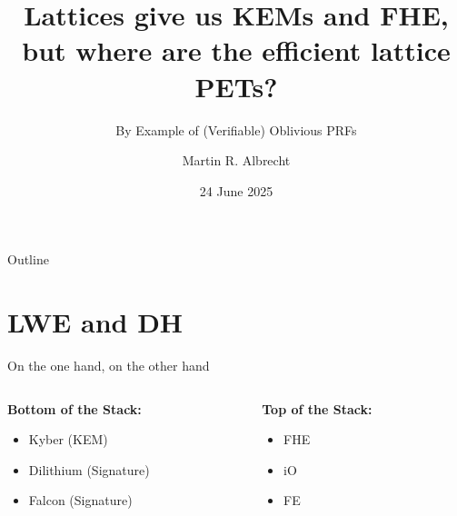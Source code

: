 \documentclass[xcolor=table,10pt,aspectratio=169]{beamer}
\author{Martin R. Albrecht}
\date{24 June 2025}
\title{Lattices give us KEMs and FHE, but where are the efficient lattice PETs?}
\subtitle{By Example of (Verifiable) Oblivious PRFs}
\begin{document}
\maketitle
\begin{frame}{Outline}
\tableofcontents
\end{frame}

\section{LWE and DH}
\label{sec:orgc131ca1}
\begin{frame}[label={sec:org29b5b28}]{On the one hand, on the other hand}
\begin{columns}[t]
\begin{column}{0.5\columnwidth}
\textbf{Bottom of the Stack:}

\begin{itemize}
\item Kyber (KEM)
\item Dilithium (Signature)
\item Falcon (Signature)
\end{itemize}
\end{column}
\begin{column}{0.5\columnwidth}
\textbf{Top of the Stack:}

\begin{itemize}
\item FHE \cite{PhD:Gentry09,ITCS:BraGenVai12,JC:CGGI20,C:GenSahWat13}
\item iO \cite{FOCS:GGHRSW13,EC:BDGM20}
\item FE \cite{EC:SahWat05,TCC:BonSahWat11}
\end{itemize}
\end{column}
\end{columns}
\end{frame}
\end{document}
